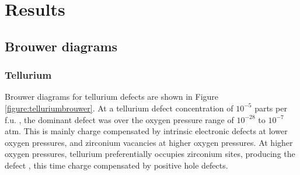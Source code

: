 
\section{Results} \label{Results}

\subsection{Brouwer diagrams}

\subsubsection{Tellurium}

Brouwer diagrams for tellurium defects are shown in Figure \ref{figure:telluriumbrouwer}. At a tellurium defect concentration of $10^{-5}$ parts per f.u. \zirconia , the dominant defect was  over the oxygen pressure range of $10^{-28}$ to $10^{-7}$ atm. This is mainly charge compensated by intrinsic electronic defects at lower oxygen pressures, and zirconium vacancies at higher oxygen pressures. At higher oxygen pressures, tellurium preferentially occupies zirconium sites, producing the defect , this time charge compensated by positive hole defects. 

